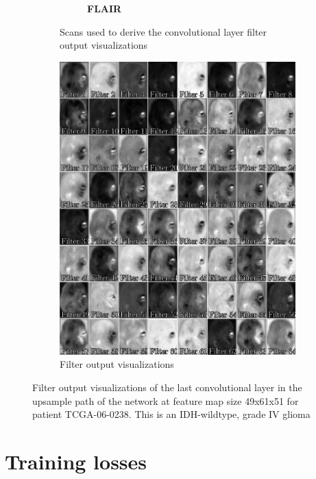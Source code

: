 \begin{subappendices}
\begin{figure}
\begin{subfigure}[b]{0.77\textwidth}
\begin{subfigure}[b]{0.24\textwidth}
        \caption*{\normalfont \textbf{\acrshort{FLAIR}}\nopunct}
        \end{subfigure}
        \caption{Scans used to derive the convolutional layer filter output visualizations}
    \end{subfigure}
    \begin{subfigure}[b]{0.77\textwidth}
        \centering
        \includegraphics[width=\textwidth]{Figures/conv_filter_HGG_deep.pdf}
        \caption{Filter output visualizations}\label{fig:prognosais_filter_hgg_deep_filter_only}
    \end{subfigure}
    \caption{Filter output visualizations of the last convolutional layer in the upsample path of the network at feature map size 49x61x51 for patient TCGA-06-0238.
     This is an \acrshort{IDH}-wildtype, grade IV glioma}\label{fig:filter_hgg_deep}
\end{figure}


\newpage

\section{Training losses}\label{app:losses}


\end{subappendices}
